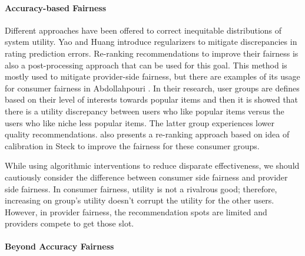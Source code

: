             \vspace{0.25cm}
            \noindent \paragraph{Accuracy-based Fairness}
            \vspace{0.25cm}
            
                Different approaches have been offered to correct inequitable distributions of system utility. Yao and Huang \cite{yao2017beyond} introduce regularizers to mitigate discrepancies in rating prediction errors. Re-ranking recommendations to improve their fairness is also a post-processing approach that can be used for this goal. This method is mostly used to mitigate provider-side fairness, but there are examples of its usage for consumer fairness in Abdollahpouri \cite{abdollahpouri2020popularity}. In their research, user groups are defines based on their level of interests towards popular items and then it is showed that there is a utility discrepancy between users who like popular items versus the users who like niche less popular items. The latter group experiences lower quality recommendations. \cite{abdollahpouri2020addressing} also presents a re-ranking approach based on idea of calibration in Steck \cite{steck2018calibrated} to improve the fairness for these consumer groups.
            
                While using algorithmic interventions to reduce disparate effectiveness, we should cautiously consider the difference between consumer side fairness and provider side fairness. In consumer fairness, utility is not a rivalrous good; therefore, increasing on group's utility doesn't corrupt the utility for the other users. However, in provider fairness, the recommendation spots are limited and providers compete to get those slot. 
            
            \vspace{0.25cm}
            \noindent \paragraph{Beyond Accuracy Fairness}
            \vspace{0.25cm}
            
